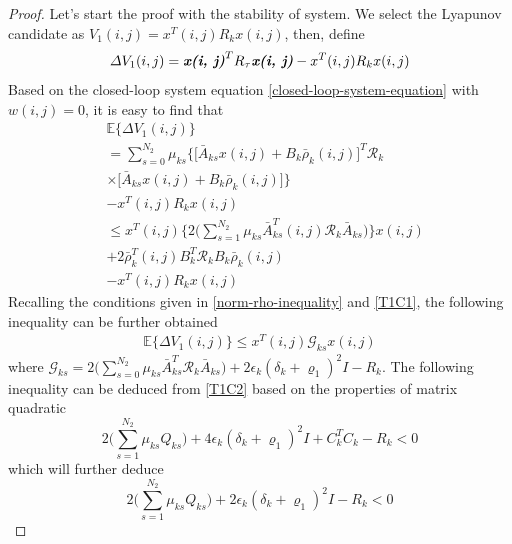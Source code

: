 \documentclass[conference]{IEEEtran}
\begin{document}
\begin{proof}
	Let's start the proof with the stability of system. We select the Lyapunov candidate as $V_{1}(i,j) = x^{T}(i,j)R_{k}x(i,j)$, then, define
	\begin{equation}\label{VAR-DELTA-V1}
	\varDelta V_{1}(i,j) = \emph{\textbf{x(i, j)}}^{T}R_{\tau}\emph{\textbf{x(i, j)}} - x^{T}(i,j)R_{k}x(i,j)
	\end{equation}
	Based on the closed-loop system equation \eqref{closed-loop-system-equation} with $w(i,j)=0$, it is easy to find that
	\begin{equation}
	\begin{split}
	&\mathbb{E}\{\varDelta V_{1}(i,j) \}\\
	&=  \sum_{s=0}^{N_{2}}\mu_{ks}\Big\{\big[\bar{A}_{ks}x(i,j)+B_{k}\bar{\rho}_{k}(i,j)\big]^{T}\mathcal{R}_{k}\\
	&\times\big[\bar{A}_{ks}x(i,j)+B_{k}\bar{\rho}_{k}(i,j)\big]\Big\}\\
	&- x^{T}(i,j)R_{k}x(i,j) \\
	&\leq x^{T}(i,j) \Big\{2\big(\sum_{s=1}^{N_{2}}\mu_{ks}\bar{A}^{T}_{ks}(i,j)\mathcal{R}_{k}\bar{A}_{ks}\big)\Big\}x(i,j)\\ &+2\bar{\rho}^{T}_{k}(i,j)B^{T}_{k}\mathcal{R}_{k}B_{k}\bar{\rho}_{k}(i,j) \\
	&-  x^{T}(i,j)R_{k}x(i,j)
	\end{split}
	\end{equation}
	Recalling the conditions given in \eqref{norm-rho-inequality} and \eqref{T1C1}, the following inequality can be further obtained
	\begin{equation}\label{combine-one-1}
	\begin{split}
		\mathbb{E}\{\varDelta  V_{1}(i,j) \} \leq x^{T}(i,j)\mathcal{G}_{ks}x(i,j)
	\end{split}
	\end{equation}
	where $\mathcal{G}_{ks}= 2\big(\sum_{s=0}^{N_{2}}\mu_{ks}\bar{A}^{T}_{ks}\mathcal{R}_{k}\bar{A}_{ks}\big)
	+ 2\epsilon_{k}(\delta_{k}+\varrho_{1})^{2}I- R_{k}$.
	The following inequality can be deduced from \eqref{T1C2} based on the properties of  matrix quadratic
	\begin{equation}
	2\big(\sum_{s=1}^{N_{2}}\mu_{ks}Q_{ks}\big)+4\epsilon_{k}(\delta_{k}+\varrho_{1})^{2}I+C^{T}_{k}C_{k}-R_{k} < 0
	\end{equation}
	which will further deduce
	\begin{equation}\label{combine-one-2}
			2\big(\sum_{s=1}^{N_{2}}\mu_{ks}Q_{ks}\big)+2\epsilon_{k}(\delta_{k}+\varrho_{1})^{2}I-R_{k} < 0

\end{equation}
\end{proof}
\end{document}
